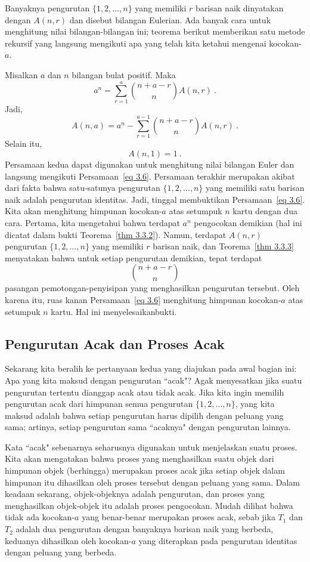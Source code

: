 \par Banyaknya pengurutan $\{1, 2, \ldots, n\}$ yang memiliki $r$ barisan naik
dinyatakan dengan $A(n, r)$ dan disebut bilangan Eulerian.  Ada
banyak cara untuk menghitung nilai bilangan-bilangan ini; teorema berikut memberikan satu
metode rekursif yang langsung mengikuti apa yang telah kita ketahui mengenai kocokan-$a$.
\begin{theorem}\label{thm 3.3.4} Misalkan $a$ dan $n$ bilangan bulat positif.  Maka
\begin{equation}
a^n = \sum_{r = 1}^a {{n + a - r}\choose{n}}A(n, r)\ .
\label{eq 3.6}
\end{equation}
Jadi,
$$
A(n, a) = a^n - \sum_{r = 1}^{a-1}{{n + a - r}\choose{n}}A(n, r)\ .
$$
Selain itu,
$$A(n, 1) = 1\ .$$
\proof Persamaan kedua dapat digunakan untuk menghitung nilai bilangan Euler dan
langsung mengikuti Persamaan~\ref{eq 3.6}.  Persamaan terakhir merupakan akibat dari
fakta bahwa satu-satunya pengurutan $\{1, 2, \ldots, n\}$ yang memiliki satu barisan naik
adalah pengurutan identitas.  Jadi, tinggal membuktikan Persamaan~\ref{eq 3.6}.  Kita akan
menghitung himpunan kocokan-$a$ atas setumpuk $n$ kartu dengan dua cara.  Pertama, kita
mengetahui bahwa terdapat $a^n$ pengocokan demikian (hal ini dicatat dalam bukti
Teorema~\ref{thm 3.3.2}).  Namun, terdapat $A(n, r)$ pengurutan $\{1, 2, \ldots, n\}$
yang memiliki $r$ barisan naik, dan Teorema~\ref{thm 3.3.3} menyatakan bahwa untuk setiap
pengurutan demikian, tepat terdapat
$${{n+a-r}\choose n}$$ 
pasangan pemotongan-penyisipan yang menghasilkan pengurutan tersebut.  Oleh karena itu,
ruas kanan Persamaan~\ref{eq 3.6} menghitung himpunan kocokan-$a$ atas setumpuk $n$ kartu.
Hal ini menyelesaikan\linebreak[4] bukti.
\end{theorem}
\subsection*{Pengurutan Acak dan Proses Acak}
Sekarang kita beralih ke pertanyaan kedua yang diajukan pada awal bagian ini: Apa yang
kita maksud dengan pengurutan ``acak"?
Agak menyesatkan jika suatu pengurutan tertentu dianggap acak atau tidak acak.  Jika kita
ingin memilih pengurutan acak dari himpunan semua pengurutan $\{1, 2, \ldots, n\}$, yang
kita maksud adalah bahwa setiap pengurutan harus dipilih dengan peluang yang sama; artinya,
setiap pengurutan sama ``acaknya" dengan pengurutan lainnya.
\par Kata ``acak" sebenarnya seharusnya digunakan untuk menjelaskan suatu proses.  Kita
akan mengatakan bahwa proses yang menghasilkan suatu objek dari himpunan objek (berhingga)
merupakan proses acak jika setiap objek dalam
himpunan itu dihasilkan oleh proses tersebut dengan peluang yang sama.  Dalam keadaan
sekarang, objek-objeknya adalah pengurutan, dan proses yang menghasilkan objek-objek itu
adalah proses pengocokan.  Mudah dilihat bahwa tidak ada kocokan-$a$ yang benar-benar
merupakan proses acak, sebab jika $T_1$ dan $T_2$ adalah dua pengurutan dengan banyaknya
barisan naik yang berbeda, keduanya dihasilkan oleh kocokan-$a$ yang diterapkan pada
pengurutan identitas dengan peluang yang berbeda.
